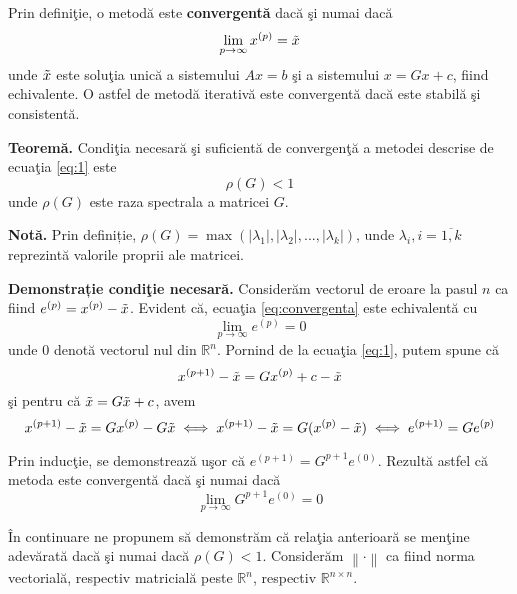 \documentclass{exam}
\theoremstyle{definition}
\newcommand{\norm}[1]{\left\lVert#1\right\rVert}
\begin{document}

\par Prin defini\c{t}ie, o metod\u{a} este \textbf{convergent\u{a}} dac\u{a} \c{s}i numai dac\u{a} 
\begin{equation}\label{eq:convergenta}
\lim_{p\rightarrow \infty}x^{(p)}=\Tilde{x}
\end{equation}
unde $\Tilde{x}$ este solu\c{t}ia unic\u{a} a sistemului $Ax=b$ \c{s}i a sistemului $x=Gx+c$, fiind echivalente.  O astfel de metod\u{a} iterativă este convergent\u{a} dac\u{a} este stabil\u{a} \c{s}i consistent\u{a}.

\noindent\makebox[\linewidth]{\rule{\textwidth}{0.4pt}}
\par \textbf{Teoremă.} Condi\c{t}ia necesar\u{a} \c{s}i suficient\u{a} de convergen\c{t}\u{a} a metodei descrise de ecua\c{t}ia \ref{eq:1} este
$${\rho}(G) < 1$$
unde ${\rho}(G)$ este raza spectrala a matricei $G$.


\par \textbf{Notă.} Prin definiție, ${\rho}(G) = \max(|{\lambda}_{1}|, |{\lambda}_{2}|, ... , |{\lambda}_{k}|)$, unde ${\lambda}_{i}, i = \overline{1,k}$ reprezint\u{a} valorile proprii ale matricei.
\par \textbf{Demonstrație condi\c{t}ie necesar\u{a}.} Considerăm vectorul de eroare la pasul $n$ ca fiind $e^{(p)}=x^{(p)}-\Tilde{x}$. Evident c\u{a}, ecua\c{t}ia \ref{eq:convergenta} este echivalent\u{a} cu $$\lim_{p\rightarrow \infty}e^{(p)}=0$$ unde $0$ denot\u{a} vectorul nul din $\mathbb{R}^n$. Pornind de la ecua\c{t}ia \ref{eq:1}, putem spune c\u{a} 
$${x}^{(p+1)} -\Tilde{x} = G{x}^{(p)} + c -\Tilde{x}$$
\c{s}i pentru că $\Tilde{x}=G\Tilde{x} + c$, avem 
$${x}^{(p+1)} -\Tilde{x} = G{x}^{(p)} - G\Tilde{x} \iff {x}^{(p+1)} -\Tilde{x} = G({x}^{(p)} - \Tilde{x}) \iff e^{(p+1)}=Ge^{(p)}$$

Prin induc\c{t}ie, se demonstreaz\u{a} u\c{s}or c\u{a} $e^{(p+1)}=G^{p+1}e^{(0)}$. Rezult\u{a} astfel c\u{a} metoda este convergent\u{a} dac\u{a} \c{s}i numai dac\u{a} 
\begin{equation} \label{eq:errvect}
\lim_{p\rightarrow \infty}G^{p+1}e^{(0)}=0
\end{equation}

\^{I}n continuare ne propunem s\u{a} demonstr\u{a}m c\u{a} rela\c{t}ia anterioar\u{a} se men\c{t}ine adev\u{a}rat\u{a} dac\u{a} \c{s}i numai dac\u{a} $\rho(G) < 1$. Consider\u{a}m $\norm{\cdot}$ ca fiind norma vectorial\u{a}, respectiv matricial\u{a} peste $\mathbb{R}^n$, respectiv $\mathbb{R}^{n\times n}$.
\end{document}
